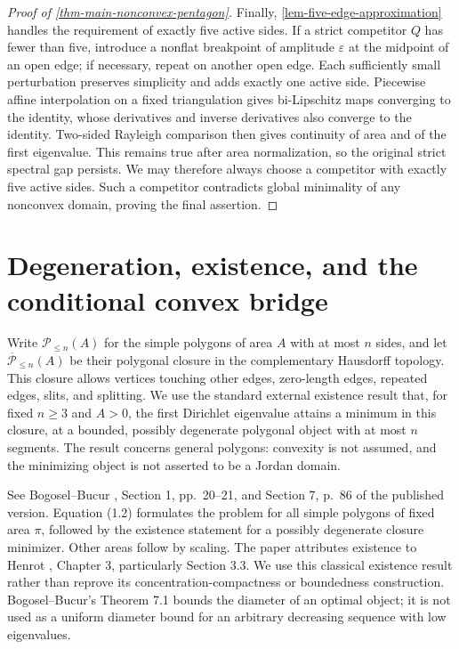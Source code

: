 \documentclass[11pt,a4paper]{article}
\theoremstyle{proofmanuscript}
\begin{document}
\begin{proof}[Proof of \ref{thm-main-nonconvex-pentagon}]
Finally, \ref{lem-five-edge-approximation} handles the requirement of exactly five active sides. If a strict competitor \(Q\) has fewer than five, introduce a nonflat breakpoint of amplitude \(\varepsilon\) at the midpoint of an open edge; if necessary, repeat on another open edge. Each sufficiently small perturbation preserves simplicity and adds exactly one active side. Piecewise affine interpolation on a fixed triangulation gives bi-Lipschitz maps converging to the identity, whose derivatives and inverse derivatives also converge to the identity. Two-sided Rayleigh comparison then gives continuity of area and of the first eigenvalue. This remains true after area normalization, so the original strict spectral gap persists. We may therefore always choose a competitor with exactly five active sides. Such a competitor contradicts global minimality of any nonconvex domain, proving the final assertion.

\end{proof}


\section{Degeneration, existence, and the conditional convex bridge}

Write \(\mathscr P_{\le n}(A)\) for the simple polygons of area \(A\) with at most \(n\) sides, and let \(\overline{\mathscr P}_{\le n}(A)\) be their polygonal closure in the complementary Hausdorff topology. This closure allows vertices touching other edges, zero-length edges, repeated edges, slits, and splitting. We use the standard external existence result that, for fixed \(n\ge3\) and \(A>0\), the first Dirichlet eigenvalue attains a minimum in this closure, at a bounded, possibly degenerate polygonal object with at most \(n\) segments. The result concerns general polygons: convexity is not assumed, and the minimizing object is not asserted to be a Jordan domain.

See Bogosel--Bucur \cite{nc:BB}, Section 1, pp.~20--21, and Section 7, p.~86 of the published version. Equation (1.2) formulates the problem for all simple polygons of fixed area \(\pi\), followed by the existence statement for a possibly degenerate closure minimizer. Other areas follow by scaling. The paper attributes existence to Henrot \cite{nc:henrot2006}, Chapter 3, particularly Section 3.3. We use this classical existence result rather than reprove its concentration-compactness or boundedness construction. Bogosel--Bucur's Theorem 7.1 bounds the diameter of an optimal object; it is not used as a uniform diameter bound for an arbitrary decreasing sequence with low eigenvalues.
\end{document}
